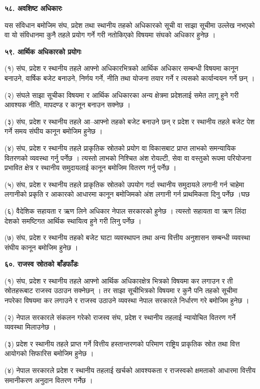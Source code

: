 \textbf{५८. अवशिष्ट अधिकारः}

यस संविधान बमोजिम संघ, प्रदेश तथा स्थानीय तहको अधिकारको सूची वा साझा सूचीमा उल्लेख नभएको वा यो संविधानमा कुनै तहले प्रयोग गर्ने गरी नतोकिएको विषयमा संघको अधिकार हुनेछ ।

\textbf{५९. आर्थिक अधिकारको प्रयोगः}

(१) संघ, प्रदेश र स्थानीय तहले आफ्नो अधिकारभित्रको आर्थिक अधिकार सम्बन्धी विषयमा कानून बनाउने, वार्षिक बजेट बनाउने, निर्णय गर्ने, नीति तथा योजना तयार गर्ने र त्यसको कार्यान्वयन गर्ने छन् ।

(२) संघले साझा सूचीका विषयमा र आर्थिक अधिकारका अन्य क्षेत्रमा प्रदेशलाई समेत लागू हुने गरी आवश्यक नीति, मापदण्ड र कानून बनाउन सक्नेछ ।

(३) संघ, प्रदेश र स्थानीय तहले आ–आफ्नो तहको बजेट बनाउने छन् र प्रदेश र स्थानीय तहले बजेट पेश गर्ने समय संघीय कानून बमोजिम
हुनेछ ।

(४) संघ, प्रदेश र स्थानीय तहले प्राकृतिक स्रोतको प्रयोग वा विकासबाट प्राप्त लाभको समन्यायिक वितरणको व्यवस्था गर्नु पर्नेछ । त्यस्तो
लाभको निश्चित अंश रोयल्टी, सेवा वा वस्तुको रूपमा परियोजना प्रभावित क्षेत्र र स्थानीय समुदायलाई कानून बमोजिम वितरण गर्नु पर्नेछ ।

(५) संघ, प्रदेश र स्थानीय तहले प्राकृतिक स्रोतको उपयोग गर्दा स्थानीय समुदायले लगानी गर्न चाहेमा लगानीको प्रकृति र आकारको आधारमा कानून बमोजिमको अंश लगानी गर्न प्राथमिकता दिनु पर्नेछ ।घछ

(६) वैदेशिक सहायता र ऋण लिने अधिकार नेपाल सरकारको हुनेछ । त्यस्तो सहायता वा ऋण लिंदा देशको समष्टिगत आर्थिक स्थायित्व हुने गरी लिनु पर्नेछ ।

(७) संघ, प्रदेश र स्थानीय तहको बजेट घाटा व्यवस्थापन तथा अन्य वित्तीय अनुशासन सम्बन्धी व्यवस्था संघीय कानून बमोजिम हुनेछ ।

\textbf{६०. राजस्व स्रोतको बाँडफाँडः}

(१) संघ, प्रदेश र स्थानीय तहले आफ्नो आर्थिक अधिकारक्षेत्र भित्रको विषयमा कर लगाउन र ती स्रोतहरूबाट राजस्व उठाउन सक्नेछन् । तर साझा सूचीभित्रको विषयमा र कुनै पनि तहको सूचीमा नपरेका विषयमा कर लगाउने र राजस्व उठाउने व्यवस्था नेपाल सरकारले निर्धारण
गरे बमोजिम हुनेछ ।

(२) नेपाल सरकारले संकलन गरेको राजस्व संघ, प्रदेश र स्थानीय तहलाई न्यायोचित वितरण गर्ने व्यवस्था मिलाउनेछ ।

(३) प्रदेश र स्थानीय तहले प्राप्त गर्ने वित्तीय हस्तान्तरणको परिमाण राष्ट्रिय प्राकृतिक स्रोत तथा वित्त आयोगको सिफारिस बमोजिम हुनेछ ।

(४) नेपाल सरकारले प्रदेश र स्थानीय तहलाई खर्चको आवश्यकता र राजस्वको क्षमताको आधारमा वित्तीय समानीकरण अनुदान वितरण गर्नेछ ।

